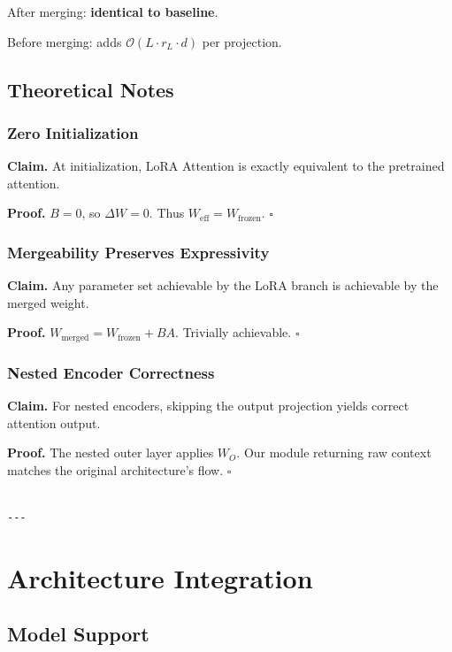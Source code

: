 After merging: \textbf{identical to baseline}.

Before merging: adds $\mathcal{O}(L \cdot r_L \cdot d)$ per projection.

\subsection{Theoretical Notes}

\subsubsection{Zero Initialization}

\textbf{Claim.} At initialization, LoRA Attention is exactly equivalent to the 
pretrained attention.

\textbf{Proof.} $B = 0$, so $\Delta W = 0$. Thus $W_\text{eff} = W_\text{frozen}$. $\square$

\subsubsection{Mergeability Preserves Expressivity}

\textbf{Claim.} Any parameter set achievable by the LoRA branch is achievable 
by the merged weight.

\textbf{Proof.} $W_\text{merged} = W_\text{frozen} + BA$. Trivially achievable. $\square$

\subsubsection{Nested Encoder Correctness}

\textbf{Claim.} For nested encoders, skipping the output projection yields 
correct attention output.

\textbf{Proof.} The nested outer layer applies $W_O$. Our module returning raw 
context matches the original architecture's flow. $\square$
\begin{lstlisting}

---
\end{lstlisting}

\section{Architecture Integration}

\subsection{Model Support}

